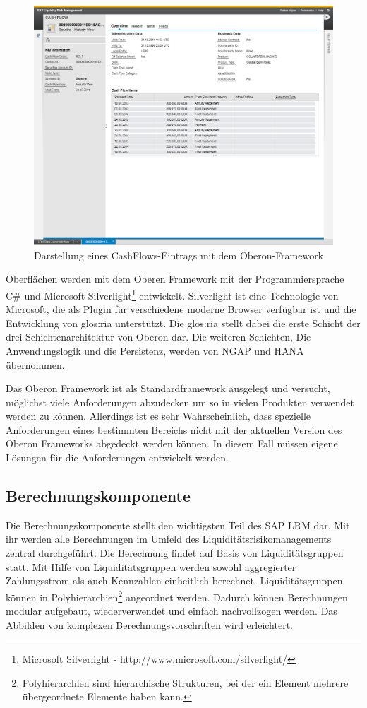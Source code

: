 \begin{figure}[h]
\centering
\setlength{\unitlength}{1mm}
\includegraphics[width=15cm]{images/OberonUI.png}
\caption{Darstellung eines CashFlows-Eintrags mit dem Oberon-Framework\label{fig:oberon}}
\end{figure}

Oberflächen werden mit dem Oberen Framework mit der Programmiersprache C\# und Microsoft Silverlight\footnote{Microsoft Silverlight - http://www.microsoft.com/silverlight/} entwickelt. Silverlight ist eine Technologie von Microsoft, die als Plugin für verschiedene moderne Browser verfügbar ist und die Entwicklung von \gls{glos:ria} unterstützt. Die \gls{glos:ria} stellt dabei die erste Schicht der drei Schichtenarchitektur von Oberon dar. Die weiteren Schichten, Die Anwendungslogik und die Persistenz, werden von NGAP und HANA übernommen.

Das Oberon Framework ist als Standardframework ausgelegt und versucht, möglichst viele Anforderungen abzudecken um so in vielen Produkten verwendet werden zu können. Allerdings ist es sehr Wahrscheinlich, dass spezielle Anforderungen eines bestimmten Bereichs nicht mit der aktuellen Version des Oberon Frameworks abgedeckt werden können. In diesem Fall müssen eigene Lösungen für die Anforderungen entwickelt werden.

\subsection{Berechnungskomponente}
Die Berechnungskomponente stellt den wichtigsten Teil des SAP LRM dar. Mit ihr werden alle Berechnungen im Umfeld des Liquiditätsrisikomanagements zentral durchgeführt. Die Berechnung findet auf Basis von Liquiditätsgruppen statt. Mit Hilfe von Liquiditätsgruppen werden sowohl aggregierter Zahlungsstrom als auch Kennzahlen einheitlich berechnet. Liquiditätsgruppen können in Polyhierarchien\footnote{Polyhierarchien sind hierarchische Strukturen, bei der ein Element mehrere übergeordnete Elemente haben kann.} angeordnet werden. Dadurch können Berechnungen modular aufgebaut, wiederverwendet und einfach nachvollzogen werden. Das Abbilden von komplexen Berechnungsvorschriften wird erleichtert.


